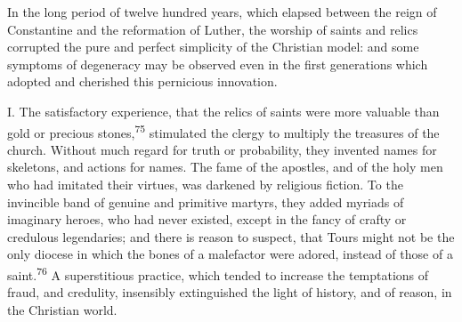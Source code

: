 

In the long period of twelve hundred years, which elapsed between
the reign of Constantine and the reformation of Luther, the
worship of saints and relics corrupted the pure and perfect
simplicity of the Christian model: and some symptoms of
degeneracy may be observed even in the first generations which
adopted and cherished this pernicious innovation.

I. The satisfactory experience, that the relics of saints were
more valuable than gold or precious stones,\textsuperscript{75} stimulated the
clergy to multiply the treasures of the church. Without much
regard for truth or probability, they invented names for
skeletons, and actions for names. The fame of the apostles, and
of the holy men who had imitated their virtues, was darkened by
religious fiction. To the invincible band of genuine and
primitive martyrs, they added myriads of imaginary heroes, who
had never existed, except in the fancy of crafty or credulous
legendaries; and there is reason to suspect, that Tours might not
be the only diocese in which the bones of a malefactor were
adored, instead of those of a saint.\textsuperscript{76} A superstitious practice,
which tended to increase the temptations of fraud, and credulity,
insensibly extinguished the light of history, and of reason, in
the Christian world.



